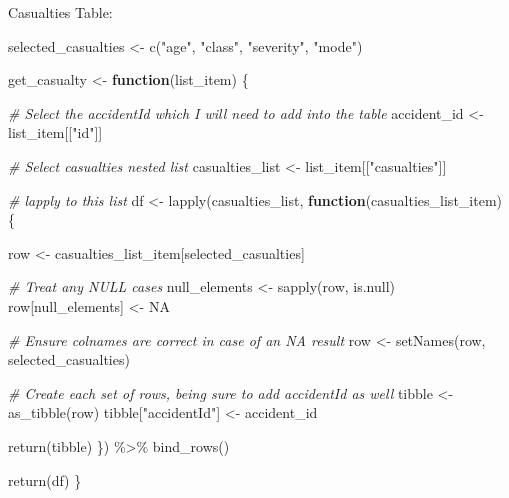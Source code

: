 \documentclass[
]{article}
\newenvironment{Shaded}{\begin{snugshade}}{\end{snugshade}}
\newcommand{\CommentTok}[1]{\textcolor[rgb]{0.56,0.35,0.01}{\textit{#1}}}
\newcommand{\ConstantTok}[1]{\textcolor[rgb]{0.00,0.00,0.00}{#1}}
\newcommand{\ControlFlowTok}[1]{\textcolor[rgb]{0.13,0.29,0.53}{\textbf{#1}}}
\newcommand{\FunctionTok}[1]{\textcolor[rgb]{0.00,0.00,0.00}{#1}}
\newcommand{\NormalTok}[1]{#1}
\newcommand{\OtherTok}[1]{\textcolor[rgb]{0.56,0.35,0.01}{#1}}
\newcommand{\SpecialCharTok}[1]{\textcolor[rgb]{0.00,0.00,0.00}{#1}}
\newcommand{\StringTok}[1]{\textcolor[rgb]{0.31,0.60,0.02}{#1}}
\begin{document}
Casualties Table:

\begin{Shaded}
\begin{Highlighting}[]
\NormalTok{ selected\_casualties }\OtherTok{\textless{}{-}} \FunctionTok{c}\NormalTok{(}\StringTok{"age"}\NormalTok{, }\StringTok{"class"}\NormalTok{, }
                           \StringTok{"severity"}\NormalTok{, }\StringTok{"mode"}\NormalTok{)}
  
  
\NormalTok{  get\_casualty }\OtherTok{\textless{}{-}} \ControlFlowTok{function}\NormalTok{(list\_item) \{}
    
    \CommentTok{\# Select the accidentId which I will need to add into the table}
\NormalTok{    accident\_id }\OtherTok{\textless{}{-}}\NormalTok{ list\_item[[}\StringTok{"id"}\NormalTok{]]}
    
    \CommentTok{\# Select casualties nested list}
\NormalTok{    casualties\_list }\OtherTok{\textless{}{-}}\NormalTok{ list\_item[[}\StringTok{"casualties"}\NormalTok{]]}
    
    \CommentTok{\# lapply to this list}
\NormalTok{    df }\OtherTok{\textless{}{-}} \FunctionTok{lapply}\NormalTok{(casualties\_list, }\ControlFlowTok{function}\NormalTok{(casualties\_list\_item) \{}
      
\NormalTok{      row }\OtherTok{\textless{}{-}}\NormalTok{ casualties\_list\_item[selected\_casualties]}
      
      \CommentTok{\# Treat any NULL cases}
\NormalTok{      null\_elements }\OtherTok{\textless{}{-}} \FunctionTok{sapply}\NormalTok{(row, is.null)}
\NormalTok{      row[null\_elements] }\OtherTok{\textless{}{-}} \ConstantTok{NA}
      
      \CommentTok{\# Ensure colnames are correct in case of an NA result}
\NormalTok{      row }\OtherTok{\textless{}{-}} \FunctionTok{setNames}\NormalTok{(row, selected\_casualties)}
      
      \CommentTok{\# Create each set of rows, being sure to add accidentId as well}
\NormalTok{      tibble }\OtherTok{\textless{}{-}} \FunctionTok{as\_tibble}\NormalTok{(row)}
\NormalTok{      tibble[}\StringTok{"accidentId"}\NormalTok{] }\OtherTok{\textless{}{-}}\NormalTok{ accident\_id}
      
      \FunctionTok{return}\NormalTok{(tibble)}
\NormalTok{    \}) }\SpecialCharTok{\%\textgreater{}\%} 
      \FunctionTok{bind\_rows}\NormalTok{()}
    
    \FunctionTok{return}\NormalTok{(df)}
\NormalTok{  \}}
  

\end{Highlighting}
\end{Shaded}
\end{document}
